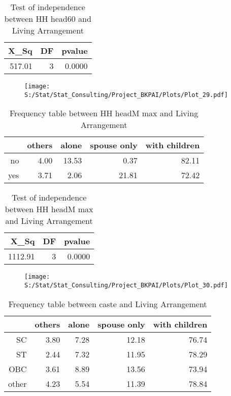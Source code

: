 \documentclass[11pt]{article}
\begin{document}
\begin{table}[H]
\centering
\begin{tabular}{rrr}
  \hline
X\_Sq & DF & pvalue \\ 
  \hline
517.01 & 3 & 0.0000 \\ 
   \hline
\end{tabular}
\caption{Test of independence between HH head60 and Living Arrangement} 
\end{table}
\begin{center}
\begin{figure}[H]
\texttt{[image: S:/Stat/Stat\_Consulting/Project\_BKPAI/Plots/Plot\_29.pdf]}

\end{figure}
\end{center}
\begin{table}[H]
\centering
\begin{tabular}{rrrrr}
  \hline
 & others & alone & spouse only & with children \\ 
  \hline
no & 4.00 & 13.53 & 0.37 & 82.11 \\ 
  yes & 3.71 & 2.06 & 21.81 & 72.42 \\ 
   \hline
\end{tabular}
\caption{Frequency table between HH headM max and Living Arrangement} 
\end{table}
\begin{table}[H]
\centering
\begin{tabular}{rrr}
  \hline
X\_Sq & DF & pvalue \\ 
  \hline
1112.91 & 3 & 0.0000 \\ 
   \hline
\end{tabular}
\caption{Test of independence between HH headM max and Living Arrangement} 
\end{table}
\begin{center}
\begin{figure}[H]
\texttt{[image: S:/Stat/Stat\_Consulting/Project\_BKPAI/Plots/Plot\_30.pdf]}

\end{figure}
\end{center}
\begin{table}[H]
\centering
\begin{tabular}{rrrrr}
  \hline
 & others & alone & spouse only & with children \\ 
  \hline
SC & 3.80 & 7.28 & 12.18 & 76.74 \\ 
  ST & 2.44 & 7.32 & 11.95 & 78.29 \\ 
  OBC & 3.61 & 8.89 & 13.56 & 73.94 \\ 
  other & 4.23 & 5.54 & 11.39 & 78.84 \\ 
   \hline
\end{tabular}
\caption{Frequency table between caste and Living Arrangement} 
\end{table}
\end{document}
